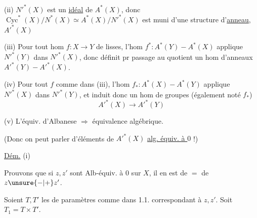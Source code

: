 (ii) $N'^*(X)$ est un \uline{idéal} de $A^*(X)$, donc $\operatorname{Cyc}^*(X)/N^*(X)\simeq A^*(X)/N'^*(X)$ est muni d'une structure d'\uline{anneau},  $A'^*(X)$

(iii) Pour tout hom $f:X\longrightarrow Y$ de    lisses, l'hom $f^*:A^*(Y)\mathbin{-}A^*(X)$ applique $N'^*(Y)$ dans $N'^*(X)$, donc définit pr passage au quotient un hom d'anneaux $A'^*(Y)\mathbin{-}A'^*(X)$.

(iv) Pour tout $f$ comme dans (iii),  l'hom  $f_*:A^*(X)\mathbin{-}A^*(Y)$  applique $N'^*(X)$ dans $N'^*(Y)$, et induit donc un hom de groupes (également noté $f_*$)
\[
A'^*(X)\longrightarrow A'^*(Y)
\]

(v) L'équiv. d'Albanese $\Longrightarrow$ équivalence algébrique.

(Donc on peut parler d'éléments de $A'^*(X)$ \uline{alg. équiv. à $0$} !)

\uline{Dém.} (i)  

Prouvons que si $z,z'$ sont Alb-équiv. à $0$ sur $X$, il en est de $=$ de $z\unsure{-|+}z'$.

Soient $T,T'$ les  de paramètres comme dans 1.1. correspondant à $z,z'$. Soit $T_1=T\times T'$.


